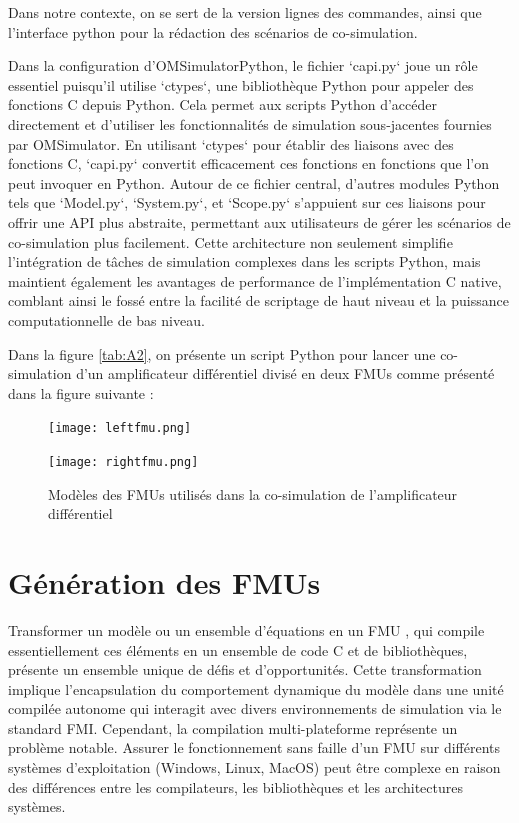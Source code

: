 Dans notre contexte, on se sert de la version lignes des commandes, ainsi que l'interface python pour la rédaction des scénarios de co-simulation. 

Dans la configuration d'OMSimulatorPython, le fichier `capi.py` joue un rôle essentiel puisqu'il utilise `ctypes`, une bibliothèque Python pour appeler des fonctions C depuis Python. Cela permet aux scripts Python d'accéder directement et d'utiliser les fonctionnalités de simulation sous-jacentes fournies par OMSimulator. En utilisant `ctypes` pour établir des liaisons avec des fonctions C, `capi.py` convertit efficacement ces fonctions en fonctions que l'on peut invoquer en Python. Autour de ce fichier central, d'autres modules Python tels que `Model.py`, `System.py`, et `Scope.py` s'appuient sur ces liaisons pour offrir une API plus abstraite, permettant aux utilisateurs de gérer les  scénarios de co-simulation plus facilement. Cette architecture non seulement simplifie l'intégration de tâches de simulation complexes dans les scripts Python, mais maintient également les avantages de performance de l'implémentation C native, comblant ainsi le fossé entre la facilité de scriptage de haut niveau et la puissance computationnelle de bas niveau.

Dans la figure \ref{tab:A2}, on présente un script Python pour lancer une co-simulation d'un amplificateur différentiel divisé en deux FMUs comme présenté dans la figure suivante :

\begin{figure}[hbt!]
    \centering
    \begin{minipage}[b]{0.45\textwidth}
        \texttt{[image: leftfmu.png]}
    \end{minipage}
    \begin{minipage}[b]{0.45\textwidth}
      \texttt{[image: rightfmu.png]}
  \end{minipage}
  \caption{Modèles des FMUs utilisés dans la co-simulation de l'amplificateur différentiel}
  \label{fig:21}
  \end{figure}

  \section{Génération des FMUs}
  Transformer un modèle ou un ensemble d'équations en un FMU , qui compile essentiellement ces éléments en un ensemble de code C et de bibliothèques, présente un ensemble unique de défis et d'opportunités. Cette transformation implique l'encapsulation du comportement dynamique du modèle dans une unité compilée autonome qui interagit avec divers environnements de simulation via le standard FMI. Cependant, la compilation multi-plateforme représente un problème notable. Assurer le fonctionnement sans faille d'un FMU sur différents systèmes d'exploitation (Windows, Linux, MacOS) peut être complexe en raison des différences entre les compilateurs, les bibliothèques et les architectures systèmes.
  
